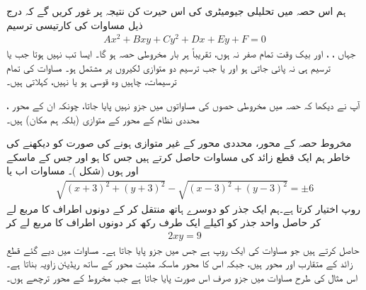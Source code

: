 ہم اس حصہ میں تحلیلی جیومیٹری کی اس حیرت کن نتیجہ پر غور کریں گے کہ درج ذیل مساوات کی کارتیسی ترسیم
\begin{align}\label{مساوات_مخروط_مخروطی_حصہ_عمومی_مساوات_الف}
Ax^2+Bxy+Cy^2+Dx+Ey+F=0
\end{align}
جہاں ، ،  اور  بیک وقت تمام صفر نہ ہوں، تقریباً ہر بار مخروطی حصہ ہو گا۔ ایسا تب نہیں ہوتا جب یا ترسیم ہی نہ پائی جاتی ہو اور یا جب ترسیم دو متوازی لکیروں پر مشتمل ہو۔ مساوات  کی تمام ترسیمات، چاہیں وہ قوسی ہو یا نہیں،  کہلاتی ہیں۔

آپ نے دیکھا کہ حصہ  میں مخروطی حصوں کی مساواتوں میں جزو  نہیں پایا جاتا، چونکہ ان کے محور  ، محددی نظام کے محور کے متوازی (بلکہ ہم مکان) ہیں۔ 

مخروط حصہ کے محور، محددی محور  کے غیر متوازی ہونے کی صورت کو دیکھنے کی خاطر ہم ایک قطع زائد کی مساوات حاصل کرتے ہیں جس کا  ہو اور جس کے ماسکے  اور  ہوں (شکل )۔ مساوات  اب  یا
\begin{align*}
\sqrt{(x+3)^2+(y+3)^2}-\sqrt{(x-3)^2+(y-3)^2}=\pm 6
\end{align*}
روپ اختیار کرتا ہے۔ہم ایک جذر کو دوسرے ہاتھ منتقل کر کے دونوں اطراف کا مربع لے کر حاصل واحد جذر کو  اکیلے ایک طرف رکھ کر دونوں اطراف کا مربع لے کر
\begin{align}\label{مساوات_مخروط_قطع_زائد_ب}
2xy=9
\end{align}
حاصل کرتے ہیں جو مساوات  کی ایک روپ ہے جس میں جزو  پایا جاتا ہے۔ مساوات  میں دیے گئے قطع زائد کے متقارب  اور  محور ہیں، جبکہ اس کا  محور ماسکہ مثبت  محور کے ساتھ  ریڈیئن زاویہ بناتا ہے۔ اس مثال کی طرح مساوات  میں جزو  صرف اس صورت پایا جاتا ہے جب مخروط کے محور ترچھے ہوں۔

